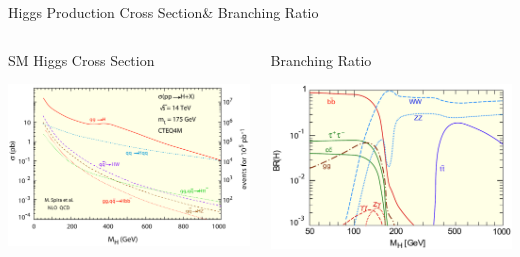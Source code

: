 \documentclass[8pt]{beamer}
\begin{document}
\begin{frame}{Higgs Production Cross Section\& Branching Ratio}

\begin{columns}
  
  \column[t]{5.75cm}
  \begin{block}{SM Higgs Cross Section}
    
    \begin{center}
      \includegraphics[width=1.00\textwidth]{img/SMHiggs_XSec.png} 
    \end{center}

  \end{block}

  \column[t]{5.75cm}
  \begin{block}{Branching Ratio}

    \begin{center}
      \includegraphics[width=1.00\textwidth]{img/SMHiggs_BR.png} 
    \end{center}
    

\end{block}
\end{columns}
\end{frame}
\end{document}
